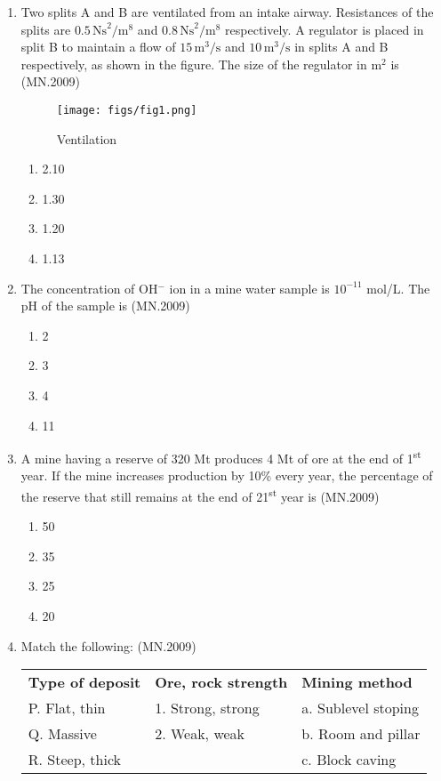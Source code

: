 \documentclass[journal]{IEEEtran}
\numberwithin{equation}{enumi}
\numberwithin{figure}{enumi}
\begin{document}
\begin{enumerate}
\item Two splits A and B are ventilated from an intake airway. Resistances of the splits are $0.5 \, \text{Ns}^2/\text{m}^8$ and $0.8 \, \text{Ns}^2/\text{m}^8$ respectively. A regulator is placed in split B to maintain a flow of $15 \, \text{m}^3/\text{s}$ and $10 \, \text{m}^3/\text{s}$ in splits A and B respectively, as shown in the figure. The size of the regulator in $\text{m}^2$ is
\hfill{(MN.2009)}
\begin{figure}[H]
  \centering
  \texttt{[image: figs/fig1.png]}
  \caption{Ventilation}
  \label{fig:placeholder}
\end{figure}


\begin{enumerate}[label=(\Alph*)]
    \item 2.10
    \item 1.30
    \item 1.20
    \item 1.13
\end{enumerate}

\item The concentration of OH$^-$ ion in a mine water sample is $10^{-11}$ mol/L. The pH of the sample is
\hfill{(MN.2009)}

\begin{enumerate}[label=(\Alph*)]
    \item 2
    \item 3
    \item 4
    \item 11
\end{enumerate}

\item A mine having a reserve of 320 Mt produces 4 Mt of ore at the end of 1\textsuperscript{st} year. If the mine increases production by 10\% every year, the percentage of the reserve that still remains at the end of 21\textsuperscript{st} year is
\hfill{(MN.2009)}
\begin{enumerate}[label=(\Alph*)]
    \item 50
    \item 35
    \item 25
    \item 20
\end{enumerate}

\item Match the following:
\hfill{(MN.2009)}
\begin{center}
\begin{tabular}{lll}
\textbf{Type of deposit} & \textbf{Ore, rock strength} & \textbf{Mining method} \\
P. Flat, thin & 1. Strong, strong & a. Sublevel stoping \\
Q. Massive & 2. Weak, weak & b. Room and pillar \\
R. Steep, thick & & c. Block caving \\
\end{tabular}
\end{center}


\end{enumerate}
\end{document}
